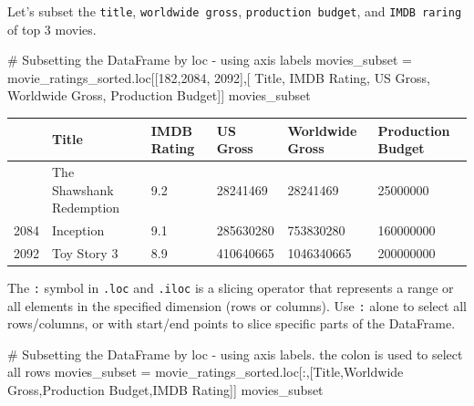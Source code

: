 \documentclass[
  letterpaper,
  DIV=11,
  numbers=noendperiod]{scrreprt}
\newenvironment{Shaded}{\begin{snugshade}}{\end{snugshade}}
\newcommand{\CommentTok}[1]{\textcolor[rgb]{0.37,0.37,0.37}{#1}}
\newcommand{\DecValTok}[1]{\textcolor[rgb]{0.68,0.00,0.00}{#1}}
\newcommand{\NormalTok}[1]{\textcolor[rgb]{0.00,0.23,0.31}{#1}}
\newcommand{\OperatorTok}[1]{\textcolor[rgb]{0.37,0.37,0.37}{#1}}
\newcommand{\StringTok}[1]{\textcolor[rgb]{0.13,0.47,0.30}{#1}}
\begin{document}
Let's subset the \texttt{title}, \texttt{worldwide\ gross},
\texttt{production\ budget}, and \texttt{IMDB\ raring} of top 3 movies.

\begin{Shaded}
\begin{Highlighting}[]
\CommentTok{\# Subsetting the DataFrame by loc {-} using axis labels}
\NormalTok{movies\_subset }\OperatorTok{=}\NormalTok{ movie\_ratings\_sorted.loc[[}\DecValTok{182}\NormalTok{,}\DecValTok{2084}\NormalTok{, }\DecValTok{2092}\NormalTok{],[ }\StringTok{\textquotesingle{}Title\textquotesingle{}}\NormalTok{, }\StringTok{\textquotesingle{}IMDB Rating\textquotesingle{}}\NormalTok{, }\StringTok{\textquotesingle{}US Gross\textquotesingle{}}\NormalTok{, }\StringTok{\textquotesingle{}Worldwide Gross\textquotesingle{}}\NormalTok{, }\StringTok{\textquotesingle{}Production Budget\textquotesingle{}}\NormalTok{]]}
\NormalTok{movies\_subset}
\end{Highlighting}
\end{Shaded}

\begin{longtable}[]{@{}llllll@{}}
\toprule\noalign{}
& Title & IMDB Rating & US Gross & Worldwide Gross & Production
Budget \\
\midrule\noalign{}
\endhead
\bottomrule\noalign{}
\endlastfoot
182 & The Shawshank Redemption & 9.2 & 28241469 & 28241469 & 25000000 \\
2084 & Inception & 9.1 & 285630280 & 753830280 & 160000000 \\
2092 & Toy Story 3 & 8.9 & 410640665 & 1046340665 & 200000000 \\
\end{longtable}

The \texttt{:} symbol in \texttt{.loc} and \texttt{.iloc} is a slicing
operator that represents a range or all elements in the specified
dimension (rows or columns). Use \texttt{:} alone to select all
rows/columns, or with start/end points to slice specific parts of the
DataFrame.

\begin{Shaded}
\begin{Highlighting}[]
\CommentTok{\# Subsetting the DataFrame by loc {-} using axis labels. the colon is used to select all rows}
\NormalTok{movies\_subset }\OperatorTok{=}\NormalTok{ movie\_ratings\_sorted.loc[:,[}\StringTok{\textquotesingle{}Title\textquotesingle{}}\NormalTok{,}\StringTok{\textquotesingle{}Worldwide Gross\textquotesingle{}}\NormalTok{,}\StringTok{\textquotesingle{}Production Budget\textquotesingle{}}\NormalTok{,}\StringTok{\textquotesingle{}IMDB Rating\textquotesingle{}}\NormalTok{]]}
\NormalTok{movies\_subset}
\end{Highlighting}
\end{Shaded}
\end{document}
